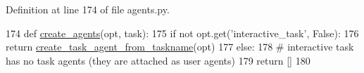 Definition at line 174 of file agents.\+py.


\begin{DoxyCode}
174 \textcolor{keyword}{def }\hyperlink{namespaceparlai_1_1tasks_1_1wizard__of__wikipedia_1_1agents_a89bd55d60a50f2604b1eb59ab0e064bc}{create\_agents}(opt, task):
175     \textcolor{keywordflow}{if} \textcolor{keywordflow}{not} opt.get(\textcolor{stringliteral}{'interactive\_task'}, \textcolor{keyword}{False}):
176         \textcolor{keywordflow}{return} \hyperlink{namespaceparlai_1_1core_1_1agents_ab4473fa54af02b5ab385b41b51dacd10}{create\_task\_agent\_from\_taskname}(opt)
177     \textcolor{keywordflow}{else}:
178         \textcolor{comment}{# interactive task has no task agents (they are attached as user agents)}
179         \textcolor{keywordflow}{return} []
180 \end{DoxyCode}
